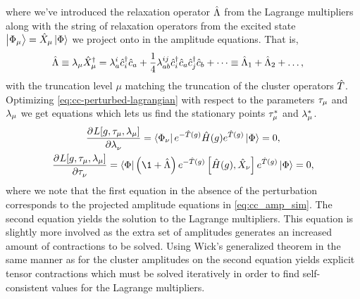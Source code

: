             where we've introduced the relaxation operator $\hat{\Lambda}$ from the
            Lagrange multipliers along with the string of relaxation operators
            from the excited state $\ket{\Phi_{\mu}} = \hat{X}_{\mu}\ket{\Phi}$
            we project onto in the amplitude equations.
            That is,
            \begin{align}
                \hat{\Lambda}
                &\equiv
                \lambda_{\mu}\hat{X}^{\dagger}_{\mu}
                = \lambda^{i}_{a}\hat{c}_{i}^{\dagger}\hat{c}_{a}
                + \frac{1}{4}\lambda^{ij}_{ab}\hat{c}_{i}^{\dagger}\hat{c}_{a}\hat{c}_{j}^{\dagger}\hat{c}_{b}
                + \dots
                \equiv
                \hat{\Lambda}_1 + \hat{\Lambda}_2 + \dots,
            \end{align}
            with the truncation level $\mu$ matching the truncation of the
            cluster operators $\hat{T}$.
            Optimizing \autoref{eq:cc-perturbed-lagrangian} with respect to the
            parameters $\tau_{\mu}$ and $\lambda_{\mu}$ we get equations
            which lets us find the stationary points $\tau^{*}_{\mu}$ and
            $\lambda^{*}_{\mu}$.
            \begin{gather}
                \dpd[]{L[g, \clustamp_{\mu},\clustlamp_{\mu}]}
                {\clustlamp_{\nu}}
                = \bra{\slat_{\nu}}
                e^{-\clust(g)}\hamil(g) e^{\clust(g)}
                \ketslat
                = 0,
                \\
                \dpd[]{L[g, \clustamp_{\mu}, \clustlamp_{\mu}]}
                {\clustamp_{\nu}}
                = \bra{\slat}
                \para{\1 + \clustl}
                e^{-\clust(g)}
                \com{\hamil(g)}{\hat{X}_{\nu}}
                e^{\clust(g)}
                \ketslat
                = 0,
            \end{gather}
            where we note that the first equation in the absence of the
            perturbation corresponds to the projected amplitude equations in
            \autoref{eq:cc_amp_sim}.
            The second equation yields the solution to the Lagrange multipliers.
            This equation is slightly more involved as the extra set of
            amplitudes generates an increased amount of contractions to be
            solved.
            Using Wick's generalized theorem in the same manner as for the
            cluster amplitudes on the second equation yields explicit tensor
            contractions which must be solved iteratively in order to find
            self-consistent values for the Lagrange multipliers.
